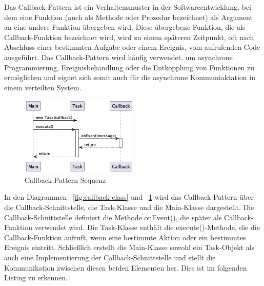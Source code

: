 \documentclass[../vs-script-first-v01.tex]{subfiles}
\begin{document}
Das Callback-Pattern ist ein Verhaltensmuster in der Softwareentwicklung, bei dem eine Funktion (auch als Methode oder Prozedur bezeichnet) als Argument an eine andere Funktion übergeben wird. Diese übergebene Funktion, die als Callback-Funktion bezeichnet wird, wird zu einem späteren Zeitpunkt, oft nach Abschluss einer bestimmten Aufgabe oder einem Ereignis, vom aufrufenden Code ausgeführt. Das Callback-Pattern wird häufig verwendet, um asynchrone Programmierung, Ereignisbehandlung oder die Entkopplung von Funktionen zu ermöglichen und eignet sich somit auch für die asynchrone Kommuniaktation in einem verteilten System.


\begin{figure}[htb]
  \centering
  \includegraphics[width=0.5\textwidth]{fig/uml/callback-seq.png}
  \caption{Callback Pattern Sequenz}
  \label{fig:callback-seq}
\end{figure}


In den Diagrammen ~\ref{fig:callback-class} und ~\ref{fig:callback-seq} wird das Callback-Pattern über die Callback-Schnittstelle, die Task-Klasse und die Main-Klasse dargestellt. Die Callback-Schnittstelle definiert die Methode onEvent(), die später als Callback-Funktion verwendet wird. Die Task-Klasse enthält die execute()-Methode, die die Callback-Funktion aufruft, wenn eine bestimmte Aktion oder ein bestimmtes Ereignis eintritt. Schließlich erstellt die Main-Klasse sowohl ein Task-Objekt als auch eine Implementierung der Callback-Schnittstelle und stellt die Kommunikation zwischen diesen beiden Elementen her. Dies ist im folgenden Listing zu erkennen.\\\\
\end{document}
